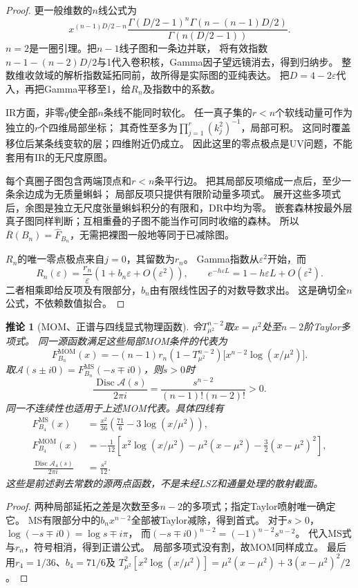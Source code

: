 \documentclass[11pt,a4paper]{ctexart}
\theoremstyle{cnplain}\newtheorem{theorem}{定理}[section]
\newtheorem{corollary}[theorem]{推论}
\theoremstyle{definition}\newtheorem{definition}[theorem]{定义}
\theoremstyle{remark}\newtheorem{remark}[theorem]{注}
\begin{document}
\begin{proof}
更一般维数的$n$线公式为
\[
 x^{(n-1)D/2-n}
 \frac{\Gamma(D/2-1)^n\Gamma(n-(n-1)D/2)}
 {\Gamma(n(D/2-1))}.
\]
$n=2$是一圈引理。把$n-1$线子图和一条边并联，
将有效指数$n-1-(n-2)D/2$与1代入卷积核，Gamma因子望远镜消去，得到归纳步。
整数维收敛域的解析指数延拓同前，故所得是实际图的亚纯表达。
把$D=4-2\varepsilon$代入，再把Gamma平移至1，给$R_n$及指数中的系数。

IR方面，非零$q$使全部$n$条线不能同时软化。
任一真子集的$r<n$个软线动量可作为独立的$r$个四维局部坐标；
其奇性至多为$\prod_{j=1}^r(k_j^2)^{-1}$，局部可积。
这同时覆盖移位后某条线变软的层；四维附近仍成立。
因此这里的零点极点是UV问题，不能套用有IR的无尺度原图。

每个真圈子图包含两端顶点和$r<n$条平行边。
把其局部反项缩成一点后，至少一条余边成为无质量蝌蚪；
局部反项只提供有限阶动量多项式。
展开这些多项式后，余图是独立无尺度张量蝌蚪积分的有限和，DR中均为零。
嵌套森林按最外层真子图同样判断；互相重叠的子图不能当作可同时收缩的森林。
所以$\overline R(B_n)=\widehat F_{B_n}$，无需把裸图一般地等同于已减除图。

$R_n$的唯一零点极点来自$j=0$，其留数为$r_n$。
Gamma指数从$\varepsilon^2$开始，而
\[
 R_n(\varepsilon)=\frac{r_n}{\varepsilon}
                 (1+b_n\varepsilon+O(\varepsilon^2)),\qquad
 e^{-h\varepsilon L}=1-h\varepsilon L+O(\varepsilon^2).
\]
二者相乘即给反项及有限部分，$b_n$由有限线性因子的对数导数求出。
这是确切全$n$公式，不依赖数值拟合。
\end{proof}

\begin{corollary}[MOM、正谱与四线显式物理函数]\label{cor:masslessphysical}
令$T_{\mu^2}^{n-2}$取$x=\mu^2$处至$n-2$阶Taylor多项式。
同一源函数满足这些局部MOM条件的代表为
\[
 F^{\mathrm{MOM}}_{B_n}(x)
 =-(n-1)r_n(1-T_{\mu^2}^{n-2})
       \bigl[x^{n-2}\log(x/\mu^2)\bigr].
\]
取$\mathcal A(s\pm i0)=F_{B_n}^{\mathrm{MS}}(-s\mp i0)$，则$s>0$时
\[
 \frac{\operatorname{Disc}\mathcal A(s)}{2\pi i}
 =\frac{s^{n-2}}{(n-1)!(n-2)!}>0.
 \label{eq:masslessspectral}
\]
同一不连续性也适用于上述MOM代表。具体四线有
\begin{align}
 F^{\mathrm{MS}}_{B_4}(x)&=\frac{x^2}{36}
                   \left(\frac{71}{6}-3\log(x/\mu^2)\right),\\
 F^{\mathrm{MOM}}_{B_4}(x)&=-\frac1{12}\left[
 x^2\log(x/\mu^2)-\mu^2(x-\mu^2)-\frac32(x-\mu^2)^2\right],\\
 \frac{\operatorname{Disc}\mathcal A_4(s)}{2\pi i}&=\frac{s^2}{12}.
\end{align}
这些是前述剥去常数的源两点函数，不是未经LSZ和通量处理的散射截面。
\end{corollary}
\begin{proof}
两种局部延拓之差是次数至多$n-2$的多项式；指定Taylor喷射唯一确定它。
MS有限部分中的$b_nx^{n-2}$全部被Taylor减除，得到首式。
对于$s>0$，$\log(-s\mp i0)=\log s\mp i\pi$，
而$(-s\mp i0)^{n-2}=(-1)^{n-2}s^{n-2}$。
代入MS式与$r_n$，符号相消，得到正谱公式。
局部多项式没有割，故MOM同样成立。
最后用$r_4=1/36$、$b_4=71/6$及
$T_{\mu^2}^{2}[x^2\log(x/\mu^2)]=\mu^2(x-\mu^2)+3(x-\mu^2)^2/2$。
\end{proof}
\end{document}
